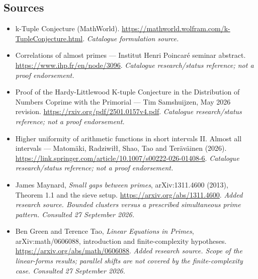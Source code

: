 \documentclass[11pt,a4paper]{article}
\begin{document}
\subsection{Sources}
\begin{itemize}\raggedright
\item[\textnormal{[S1]}]\hypertarget{source:statement:1}{} k-Tuple Conjecture (MathWorld).
\url{https://mathworld.wolfram.com/k-TupleConjecture.html}.
{\small\textit{Catalogue formulation source.}}
\item[\textnormal{[S2]}]\hypertarget{source:statement:2}{} Correlations of almost primes — Institut Henri Poincaré seminar abstract.
\url{https://www.ihp.fr/en/node/3096}.
{\small\textit{Catalogue research/status reference; not a proof endorsement.}}
\item[\textnormal{[S3]}]\hypertarget{source:statement:3}{} Proof of the Hardy-Littlewood K-tuple Conjecture in the Distribution of Numbers Coprime with the Primorial — Tim Samshuijzen, May 2026 revision.
\url{https://rxiv.org/pdf/2501.0157v4.pdf}.
{\small\textit{Catalogue research/status reference; not a proof endorsement.}}
\item[\textnormal{[S4]}]\hypertarget{source:statement:4}{} Higher uniformity of arithmetic functions in short intervals II. Almost all intervals — Matomäki, Radziwiłł, Shao, Tao and Teräväinen (2026).
\url{https://link.springer.com/article/10.1007/s00222-026-01408-6}.
{\small\textit{Catalogue research/status reference; not a proof endorsement.}}
\item[\textnormal{[E1]}]\hypertarget{extra:statement:1}{} James Maynard, \emph{Small gaps between primes}, arXiv:1311.4600 (2013), Theorem 1.1 and the sieve setup.
\url{https://arxiv.org/abs/1311.4600}.
{\small\textit{Added research source. Bounded clusters versus a prescribed simultaneous prime pattern. Consulted 27 September 2026.}}
\item[\textnormal{[E2]}]\hypertarget{extra:statement:2}{} Ben Green and Terence Tao, \emph{Linear Equations in Primes}, arXiv:math/0606088, introduction and finite-complexity hypotheses.
\url{https://arxiv.org/abs/math/0606088}.
{\small\textit{Added research source. Scope of the linear-forms results; parallel shifts are not covered by the finite-complexity case. Consulted 27 September 2026.}}
\end{itemize}

\end{document}
